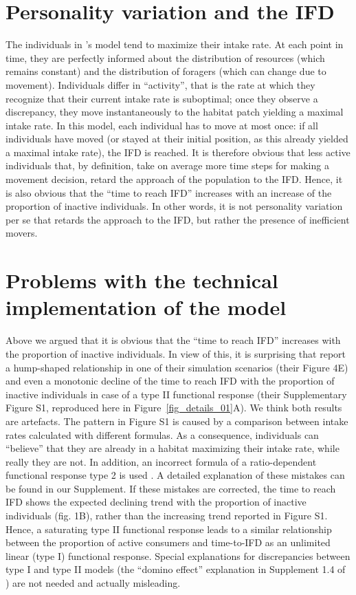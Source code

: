 \begin{refsection}
	\section*{Personality variation and the IFD}
	
	The individuals in \citeauthor{dinuzzo2020}'s model tend to maximize their intake rate.
	At each point in time, they are perfectly informed about the distribution of resources (which remains constant) and the distribution of foragers (which can change due to movement).
	Individuals differ in ``activity'', that is the rate at which they recognize that their current intake rate is suboptimal; once they observe a discrepancy, they move instantaneously to the habitat patch yielding a maximal intake rate.
	In this model, each individual has to move at most once: if all individuals have moved (or stayed at their initial position, as this already yielded a maximal intake rate), the IFD is reached.
	It is therefore obvious that less active individuals that, by definition, take on average more time steps for making a movement decision, retard the approach of the population to the IFD.
	Hence, it is also obvious that the ``time to reach IFD'' increases with an increase of the proportion of inactive individuals.
	In other words, it is not personality variation per se that retards the approach to the IFD, but rather the presence of inefficient movers.

	\section*{Problems with the technical implementation of the model}

	Above we argued that it is obvious that the ``time to reach IFD'' increases with the proportion of inactive individuals.
	In view of this, it is surprising that \citeauthor{dinuzzo2020} report a hump-shaped relationship in one of their simulation scenarios (their Figure 4E) and even a monotonic decline of the time to reach IFD with the proportion of inactive individuals in case of a type II functional response (their Supplementary Figure S1, reproduced here in Figure~\ref{fig_details_01}A).
	We think both results are artefacts.
	The pattern in Figure S1 is caused by a comparison between intake rates calculated with different formulas.
	As a consequence, individuals can “believe” that they are already in a habitat maximizing their intake rate, while really they are not.
	In addition, an incorrect formula of a ratio-dependent functional response type 2 is used \citep[following][]{abrams2000}.
	A detailed explanation of these mistakes can be found in our Supplement.
	If these mistakes are corrected, the time to reach IFD shows the expected declining trend with the proportion of inactive individuals (fig. 1B), rather than the increasing trend reported in Figure S1.
	Hence, a saturating type II functional response leads to a similar relationship between the proportion of active consumers and time-to-IFD as an unlimited linear (type I) functional response.
	Special explanations for discrepancies between type I and type II models (the ``domino effect'' explanation in Supplement 1.4 of \cite{dinuzzo2020}) are not needed and actually misleading.
	

\end{refsection}
